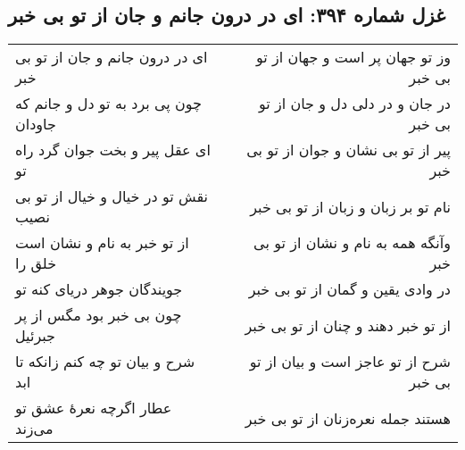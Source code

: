 \begin{center}
\section*{غزل شماره ۳۹۴: ای در درون جانم و جان از تو بی خبر}
\label{sec:394}
\begin{longtable}{l p{0.5cm} r}
ای در درون جانم و جان از تو بی خبر
&&
وز تو جهان پر است و جهان از تو بی خبر
\\
چون پی برد به تو دل و جانم که جاودان
&&
در جان و در دلی دل و جان از تو بی خبر
\\
ای عقل پیر و بخت جوان گرد راه تو
&&
پیر از تو بی نشان و جوان از تو بی خبر
\\
نقش تو در خیال و خیال از تو بی نصیب
&&
نام تو بر زبان و زبان از تو بی خبر
\\
از تو خبر به نام و نشان است خلق را
&&
وآنگه همه به نام و نشان از تو بی خبر
\\
جویندگان جوهر دریای کنه تو
&&
در وادی یقین و گمان از تو بی خبر
\\
چون بی خبر بود مگس از پر جبرئیل
&&
از تو خبر دهند و چنان از تو بی خبر
\\
شرح و بیان تو چه کنم زانکه تا ابد
&&
شرح از تو عاجز است و بیان از تو بی خبر
\\
عطار اگرچه نعرهٔ عشق تو می‌زند
&&
هستند جمله نعره‌زنان از تو بی خبر
\\
\end{longtable}
\end{center}

